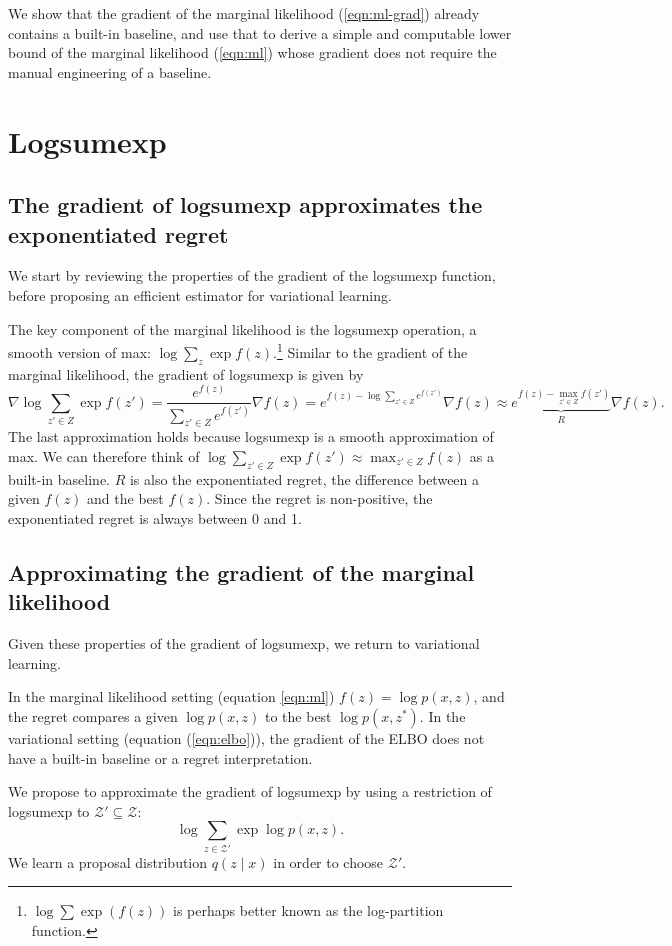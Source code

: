\documentclass[12pt]{article}
\begin{document}
We show that the gradient of the marginal likelihood (\ref{eqn:ml-grad}) already contains
a built-in baseline, and use that to derive a simple and computable lower bound
of the marginal likelihood
(\ref{eqn:ml}) whose gradient does not require the manual engineering of a baseline.

\section{Logsumexp}
\subsection{The gradient of logsumexp approximates the exponentiated regret}
We start by reviewing the properties of the gradient of the logsumexp function,
before proposing an efficient estimator for variational learning.

The key component of the marginal likelihood is the logsumexp operation,
a smooth version of max: $\log \sum_z \exp f(z)$.\footnote{
$\log\sum\exp(f(z))$ is perhaps better known as the log-partition function.
}
Similar to the gradient of the marginal likelihood,
the gradient of logsumexp is given by
$$
\nabla \log \sum_{z'\in Z} \exp f(z')
= \frac{e^{f(z)}}{\sum_{z' \in Z} e^{f(z')}} \nabla f(z)
= e^{f(z) - \log \sum_{z' \in Z} e^{f(z')}} \nabla f(z)
\approx \underbrace{e^{f(z) - \max_{z' \in Z} f(z')}}_{R} \nabla f(z).
$$
The last approximation holds because logsumexp is a smooth approximation of max.
We can therefore think of $\log \sum_{z'\in Z}\exp f(z')\approx \max_{z'\in Z} f(z)$
as a built-in baseline.
$R$ is also the exponentiated regret, the difference between a given $f(z)$
and the best $f(z)$.
Since the regret is non-positive, the exponentiated regret is always between 0 and 1.

\subsection{Approximating the gradient of the marginal likelihood}
Given these properties of the gradient of logsumexp, we return to variational learning.

In the marginal likelihood setting (equation \ref{eqn:ml}) $f(z) = \log p(x,z)$,
and the regret compares a given $\log p(x,z)$ to the best $\log p(x,z^*)$.
In the variational setting (equation (\ref{eqn:elbo})),
the gradient of the ELBO does not have a built-in baseline or a regret interpretation.

We propose to approximate the gradient of logsumexp by using a restriction of logsumexp to
    $\mathcal{Z}'\subseteq\mathcal{Z}$:
\begin{equation}
\log\sum_{z \in \mathcal{Z}'}\exp \log p(x,z).
\end{equation}
We learn a proposal distribution $q(z\mid x)$ in order to choose $\mathcal{Z}'$.
\end{document}
